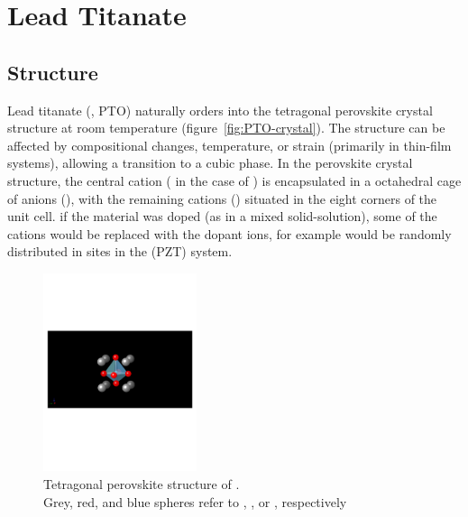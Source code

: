 \chapter{Lead Titanate}
\label{chap:Materials}
\thispagestyle{empty}



\section{Structure}
\label{sec:Materials-Struct}

Lead titanate (\PTO{}, PTO) naturally orders into the tetragonal perovskite crystal structure at room temperature (figure~\vref{fig:PTO-crystal}). The structure can be affected by compositional changes, temperature, or strain (primarily in thin-film systems), allowing a transition to a cubic phase. In the perovskite crystal structure, the central cation (\TiIon{} in the case of \PTO{}) is encapsulated in a octahedral cage of anions (\OIon{}), with the remaining cations (\PbIon{}) situated in the eight corners of the unit cell. if the material was doped (as in a mixed solid-solution), some of the cations would be replaced with the dopant ions, for example \ZrIon{} would be randomly distributed in  \TiIon{} sites in the \PZT{} (PZT) system.

\begin{figure}[htb]
   \begin{center}
   \includegraphics[width=0.4\textwidth]{./figures/materials/pbtio3-crystal.pdf} 
   \caption[Crystal structure of \PTO{}]{Tetragonal perovskite structure of \PTO{}. \\Grey, red, and blue spheres refer to \PbIon{}, %
   		\TiIon{}, or \OIon{}, respectively}
   \label{fig:PTO-crystal}
   \end{center}
\end{figure}


